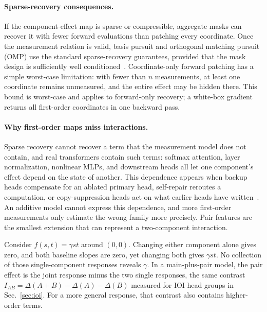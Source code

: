 \documentclass[sigconf,10pt,nonacm,balance=false]{acmart}
\begin{document}
\paragraph{Sparse-recovery consequences.}
If the component-effect map is sparse or compressible, aggregate masks can recover it with fewer forward evaluations than patching every coordinate. Once the measurement relation is valid, basis pursuit and orthogonal matching pursuit (OMP) use the standard sparse-recovery guarantees, provided that the mask design is sufficiently well conditioned~\cite{candes2006robust,tropp2007omp,berinde2008expander}. Coordinate-only forward patching has a simple worst-case limitation: with fewer than $n$ measurements, at least one coordinate remains unmeasured, and the entire effect may be hidden there. This bound is worst-case and applies to forward-only recovery; a white-box gradient returns all first-order coordinates in one backward pass.

\paragraph{Why first-order maps miss interactions.}
Sparse recovery cannot recover a term that the measurement model does not contain, and real transformers contain such terms: softmax attention, layer normalization, nonlinear MLPs, and downstream heads all let one component's effect depend on the state of another. This dependence appears when backup heads compensate for an ablated primary head, self-repair reroutes a computation, or copy-suppression heads act on what earlier heads have written~\cite{wang2022ioi,mcgrath2023hydra,mcdougall2023copy}. An additive model cannot express this dependence, and more first-order measurements only estimate the wrong family more precisely. Pair features are the smallest extension that can represent a two-component interaction.

Consider $f(s,t)=\gamma st$ around $(0,0)$. Changing either component alone gives zero, and both baseline slopes are zero, yet changing both gives $\gamma st$. No collection of those single-component responses reveals $\gamma$. In a main-plus-pair model, the pair effect is the joint response minus the two single responses, the same contrast $I_{AB}=\Delta(A{+}B)-\Delta(A)-\Delta(B)$ measured for IOI head groups in Sec.~\ref{sec:ioi}. For a more general response, that contrast also contains higher-order terms.
\end{document}
